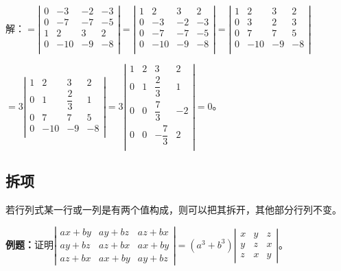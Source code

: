 \documentclass[UTF8, 12pt]{ctexart}
\begin{document}
解：$=\left|\begin{array}{cccc} 
    0 & -3 & -2 & -3 \\
    0 & -7  & -7 & -5 \\
    1 & 2 & 3 & 2 \\
    0 & -10 & -9 & -8 \\
\end{array}\right|=\left|\begin{array}{cccc} 
    1 & 2 & 3 & 2 \\
    0 & -3 & -2 & -3 \\
    0 & -7  & -7 & -5 \\
    0 & -10 & -9 & -8 \\
\end{array}\right|=\left|\begin{array}{cccc} 
    1 & 2 & 3 & 2 \\
    0 & 3 & 2 & 3 \\
    0 & 7  & 7 & 5 \\
    0 & -10 & -9 & -8 \\
\end{array}\right|$

$=3\left|\begin{array}{cccc} 
    1 & 2 & 3 & 2 \\
    0 & 1 & \dfrac{2}{3} & 1 \\
    0 & 7  & 7 & 5 \\
    0 & -10 & -9 & -8 \\
\end{array}\right|
=3\left|\begin{array}{cccc} 
    1 & 2 & 3 & 2 \\
    0 & 1 & \dfrac{2}{3} & 1 \\
    0 & 0  & \dfrac{7}{3} & -2 \\
    0 & 0  & -\dfrac{7}{3} & 2 \\
\end{array}\right|=0$。

\subsection{拆项}

若行列式某一行或一列是有两个值构成，则可以把其拆开，其他部分行列不变。

\textbf{例题：}证明$\left|\begin{array}{ccc}
    ax+by & ay+bz & az+bx \\
    ay+bz & az+bx & ax+by \\
    az+bx & ax+by & ay+bz
\end{array}\right|=(a^3+b^3)\left|\begin{array}{ccc}
    x & y & z \\
    y & z & x \\
    z & x & y
\end{array}\right|$。
\end{document}

